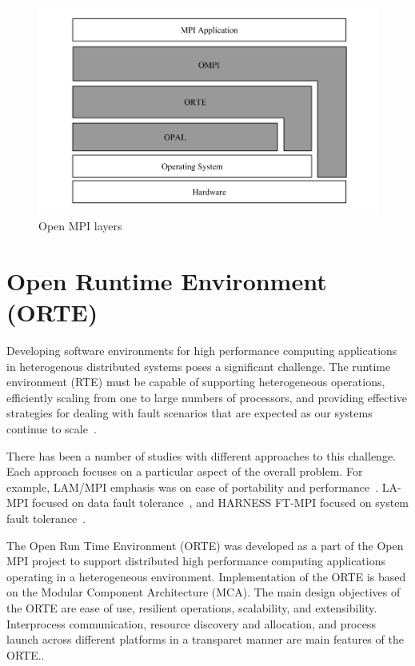 \begin{figure}[h!]
\centering
\includegraphics[scale=0.5]{images/open-mpi-layers.png}
\caption{Open MPI layers}
\label{fig:open-mpi-layers}
\end{figure}


\section{Open Runtime Environment (ORTE)}
\label{sec:orte}
Developing software environments for high performance computing applications in heterogenous distributed systems poses a significant challenge. The runtime environment (RTE) must be capable of supporting heterogeneous operations, efficiently scaling from one to large numbers of processors, and providing effective strategies for dealing with fault scenarios that are expected as our systems continue to scale~\cite{kronstadt2005peta}.

There has been a number of studies with different approaches to this challenge. Each approach focuses on a particular aspect of the overall problem. For example, LAM/MPI emphasis was on ease of portability and performance~\cite{squyres2004component}. LA-MPI focused on data fault tolerance~\cite{aulwes2004architecture}, and HARNESS FT-MPI focused on system fault tolerance~\cite{fagg2002harness}.

The Open Run Time Environment (ORTE) was developed as a part of the Open MPI project to support distributed high performance computing applications operating in a heterogeneous environment. Implementation of the ORTE is based on the Modular Component Architecture (MCA). The main design objectives of the ORTE are ease of use, resilient operations, scalability, and extensibility. Interprocess communication, resource discovery and allocation, and process launch across different platforms in a transparet manner are main features of the ORTE.\cite{castain2005open,Castain2008153,castain2008open}.

